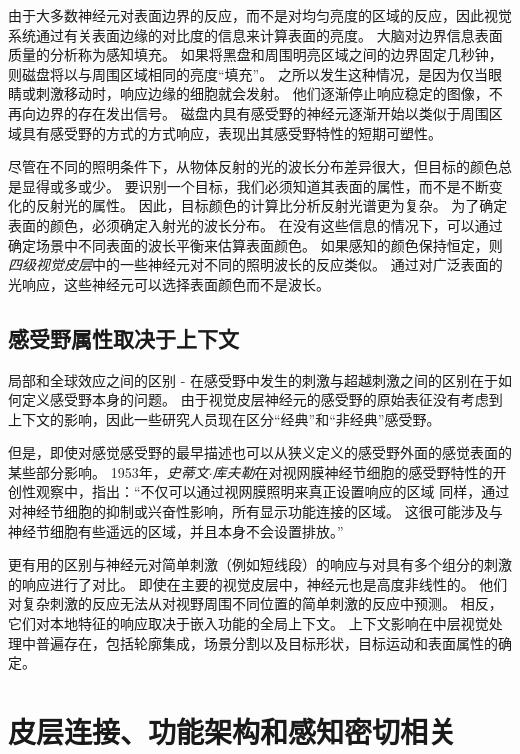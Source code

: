 由于大多数神经元对表面边界的反应，而不是对均匀亮度的区域的反应，因此视觉系统通过有关表面边缘的对比度的信息来计算表面的亮度。
大脑对边界信息表面质量的分析称为感知填充。
如果将黑盘和周围明亮区域之间的边界固定几秒钟，则磁盘将以与周围区域相同的亮度“填充”。
之所以发生这种情况，是因为仅当眼睛或刺激移动时，响应边缘的细胞就会发射。
他们逐渐停止响应稳定的图像，不再向边界的存在发出信号。
磁盘内具有感受野的神经元逐渐开始以类似于周围区域具有感受野的方式的方式响应，表现出其感受野特性的短期可塑性。


尽管在不同的照明条件下，从物体反射的光的波长分布差异很大，但目标的颜色总是显得或多或少。
要识别一个目标，我们必须知道其表面的属性，而不是不断变化的反射光的属性。
因此，目标颜色的计算比分析反射光谱更为复杂。
为了确定表面的颜色，必须确定入射光的波长分布。
在没有这些信息的情况下，可以通过确定场景中不同表面的波长平衡来估算表面颜色。
如果感知的颜色保持恒定，则\textit{四级视觉皮层}中的一些神经元对不同的照明波长的反应类似。
通过对广泛表面的光响应，这些神经元可以选择表面颜色而不是波长。



\subsection{感受野属性取决于上下文}

局部和全球效应之间的区别 - 在感受野中发生的刺激与超越刺激之间的区别在于如何定义感受野本身的问题。
由于视觉皮层神经元的感受野的原始表征没有考虑到上下文的影响，因此一些研究人员现在区分“经典”和“非经典”感受野。


但是，即使对感觉感受野的最早描述也可以从狭义定义的感受野外面的感觉表面的某些部分影响。
1953年，\textit{史蒂文$\cdot$库夫勒}在对视网膜神经节细胞的感受野特性的开创性观察中，指出：“不仅可以通过视网膜照明来真正设置响应的区域 同样，通过对神经节细胞的抑制或兴奋性影响，所有显示功能连接的区域。
这很可能涉及与神经节细胞有些遥远的区域，并且本身不会设置排放。”


更有用的区别与神经元对简单刺激（例如短线段）的响应与对具有多个组分的刺激的响应进行了对比。
即使在主要的视觉皮层中，神经元也是高度非线性的。
他们对复杂刺激的反应无法从对视野周围不同位置的简单刺激的反应中预测。
相反，它们对本地特征的响应取决于嵌入功能的全局上下文。
上下文影响在中层视觉处理中普遍存在，包括轮廓集成，场景分割以及目标形状，目标运动和表面属性的确定。



\section{皮层连接、功能架构和感知密切相关}

